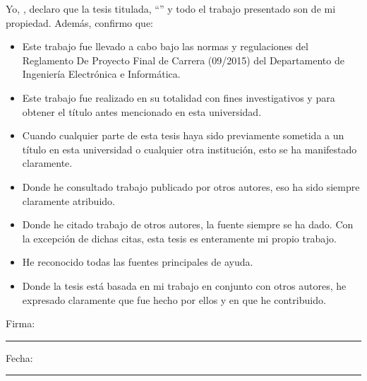 \documentclass[
11pt, %
english, %
spanish,
singlespacing, %
liststotoc, %
headsepline, %
]{MastersDoctoralThesis} %
\begin{document}
\renewcommand{\authorshipname}{Declaración de autoría}

\begin{declaration}
\addchaptertocentry{\authorshipname}

\noindent Yo, \authorname, declaro que la tesis titulada, \enquote{\ttitle} y todo el trabajo presentado son de mi propiedad. Además, confirmo que:

\begin{itemize}
\item Este trabajo fue llevado a cabo bajo las normas y regulaciones del Reglamento De Proyecto Final de Carrera (09/2015) del Departamento de Ingeniería Electrónica e Informática.
\item Este trabajo fue realizado en su totalidad con fines investigativos y para obtener el título antes mencionado en esta universidad.
\item Cuando cualquier parte de esta tesis haya sido previamente sometida a un título en esta universidad o cualquier otra institución, esto se ha manifestado claramente.
\item Donde he consultado trabajo publicado por otros autores, eso ha sido siempre claramente atribuido.
\item Donde he citado trabajo de otros autores, la fuente siempre se ha dado. Con la excepción de dichas citas, esta tesis es enteramente mi propio trabajo.
\item He reconocido todas las fuentes principales de ayuda.
\item Donde la tesis está basada en mi trabajo en conjunto con otros autores, he expresado claramente que fue hecho por ellos y en que he contribuido.\\
\end{itemize}

\noindent Firma:\\
\rule[0.5em]{25em}{0.5pt} %

\noindent Fecha:\\
\rule[0.5em]{25em}{0.5pt} %
\end{declaration}

\cleardoublepage


\end{document}

